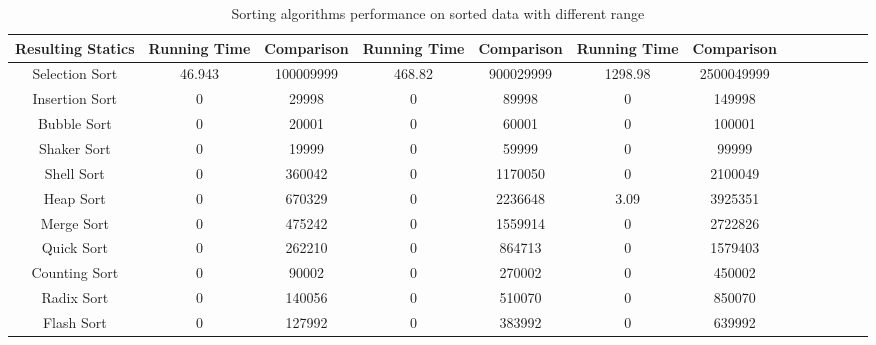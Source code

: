 \documentclass[11pt,a4paper]{article}
\begin{document}
{\begin{table}[H]
{\begin{tabular}{|c|c|c|c|c|c|c|c|c|c|c|c|c|}
		 \hline
		 Resulting Statics & Running Time & Comparison & Running Time & Comparison & Running Time & Comparison\\
		 \hline
		 Selection Sort & 46.943 & 100009999 & 468.82 & 900029999 & 1298.98 & 2500049999\\
		 \hline
		 Insertion Sort & 0 & 29998 & 0 & 89998 & 0 & 149998\\
		 \hline
		 Bubble Sort 	& 0 & 20001 & 0 & 60001 & 0 & 100001\\
		 \hline
		 Shaker Sort 	& 0 & 19999 & 0 & 59999 & 0 & 99999\\
		 \hline
		 Shell Sort		& 0 & 360042 & 0 & 1170050 & 0 & 2100049\\
		 \hline
		 Heap Sort		& 0 & 670329 & 0 & 2236648 & 3.09 & 3925351\\
		 \hline
		 Merge Sort		& 0 & 475242 & 0 & 1559914 & 0 & 2722826\\
		 \hline
		 Quick Sort		& 0 & 262210 & 0 & 864713 & 0 & 1579403\\
		 \hline
		 Counting Sort 	& 0 & 90002 & 0 & 270002 & 0 & 450002\\
		 \hline
		 Radix Sort 	& 0 & 140056 & 0 & 510070 & 0 & 850070\\
		 \hline
		 Flash Sort 	& 0 & 127992 & 0 & 383992 & 0 & 639992\\
		 \hline
		\end{tabular}}
		\caption{Sorting algorithms performance on sorted data with different range}
		\end{table}
		
}
\end{document}

